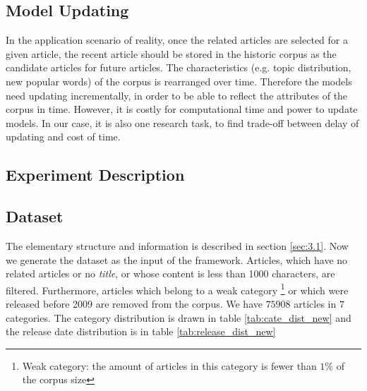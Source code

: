 \subsection{Model Updating}

In the application scenario of reality, once the related articles are selected for a given article, the recent article should be stored in the historic corpus as the candidate articles for future articles. The characteristics (e.g. topic distribution, new popular words) of the corpus is rearranged over time. Therefore the models need updating incrementally, in order to be able to reflect the attributes of the corpus in time. However, it is costly for computational time and power to update models. In our case, it is also one research task, to find trade-off between delay of updating and cost of time.

\subsection{Experiment Description}
\label{sec:4.3}


\subsection{Dataset}

The elementary structure and information is described in section \ref{sec:3.1}. Now we generate the dataset as the input of the framework. Articles, which have no related articles or no \textit{title}, or whose content is less than 1000 characters, are filtered. Furthermore, articles which belong to a weak category \footnote{Weak category: the amount of articles in this category is fewer than $1\%$ of the corpus size} or which were released before 2009 are removed from the corpus. We have $75908$ articles in $7$ categories. The category distribution is drawn in table \ref{tab:cate_dist_new} and the release date distribution is in table \ref{tab:release_dist_new}

